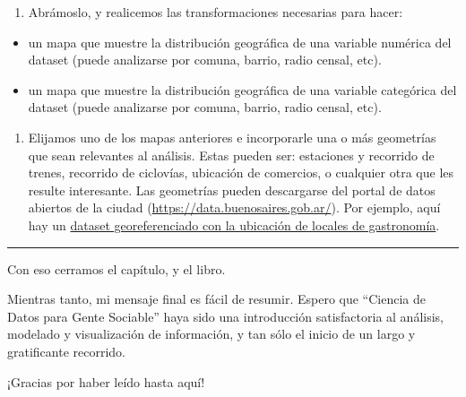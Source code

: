 \documentclass[spanish,]{book}
\providecommand{\tightlist}{%
  \setlength{\itemsep}{0pt}\setlength{\parskip}{0pt}}
\begin{document}
\begin{enumerate}
\def\labelenumi{\Roman{enumi}.}
\setcounter{enumi}{1}
\tightlist
\item
  Abrámoslo, y realicemos las transformaciones necesarias para hacer:
\end{enumerate}

\begin{itemize}
\item
  un mapa que muestre la distribución geográfica de una variable numérica del dataset (puede analizarse por comuna, barrio, radio censal, etc).
\item
  un mapa que muestre la distribución geográfica de una variable categórica del dataset (puede analizarse por comuna, barrio, radio censal, etc).
\end{itemize}

\begin{enumerate}
\def\labelenumi{\Roman{enumi}.}
\setcounter{enumi}{2}
\tightlist
\item
  Elijamos uno de los mapas anteriores e incorporarle una o más geometrías que sean relevantes al análisis. Estas pueden ser: estaciones y recorrido de trenes, recorrido de ciclovías, ubicación de comercios, o cualquier otra que les resulte interesante. Las geometrías pueden descargarse del portal de datos abiertos de la ciudad (\url{https://data.buenosaires.gob.ar/}). Por ejemplo, aquí hay un \href{https://data.buenosaires.gob.ar/dataset/oferta-establecimientos-gastronomicos}{dataset georeferenciado con la ubicación de locales de gastronomía}.
\end{enumerate}

\begin{center}\rule{0.5\linewidth}{\linethickness}\end{center}

Con eso cerramos el capítulo, y el libro.

Mientras tanto, mi mensaje final es fácil de resumir. Espero que ``Ciencia de Datos para Gente Sociable'' haya sido una introducción satisfactoria al análisis, modelado y visualización de información, y tan sólo el inicio de un largo y gratificante recorrido.

¡Gracias por haber leído hasta aquí!


\end{document}
